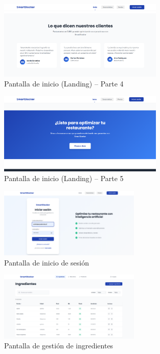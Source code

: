 \begin{figure}[htbp]
    \centering
    \includegraphics[width=0.7\textwidth]{images/landing4.png}
    \caption{Pantalla de inicio (Landing) – Parte 4}
    \label{fig:ux-landing4}
\end{figure}

\begin{figure}[htbp]
    \centering
    \includegraphics[width=0.7\textwidth]{images/landing5.png}
    \caption{Pantalla de inicio (Landing) – Parte 5}
    \label{fig:ux-landing5}
\end{figure}

\begin{figure}[htbp]
    \centering
    \includegraphics[width=0.6\textwidth]{images/login.png}
    \caption{Pantalla de inicio de sesión}
    \label{fig:ux-login}
\end{figure}

\begin{figure}[htbp]
    \centering
    \includegraphics[width=0.6\textwidth]{images/ingredientes.png}
    \caption{Pantalla de gestión de ingredientes}
    \label{fig:ux-ingredientes}
\end{figure}

